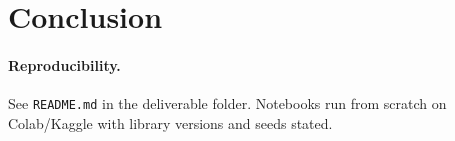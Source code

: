 \section{Conclusion}

\paragraph{Reproducibility.} See \texttt{README.md} in the deliverable folder. Notebooks run
from scratch on Colab/Kaggle with library versions and seeds stated.
